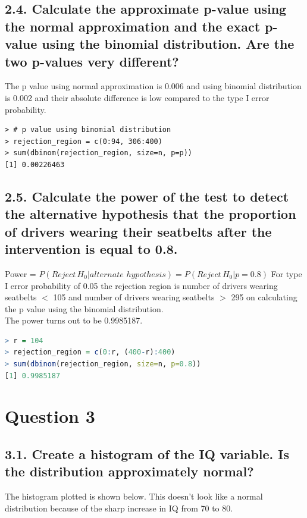 \documentclass[11pt]{article}
\begin{document}
\subsection*{2.4. Calculate the approximate p-value using the normal approximation and the exact p-value using the binomial distribution. Are the two p-values very different?}
The p value using normal approximation is 0.006 and using binomial distribution is 0.002 and their absolute difference is low compared to the type I error probability.
\begin{lstlisting}
> # p value using binomial distribution
> rejection_region = c(0:94, 306:400)
> sum(dbinom(rejection_region, size=n, p=p))
[1] 0.00226463
\end{lstlisting}


\subsection*{2.5. Calculate the power of the test to detect the alternative hypothesis that the proportion of drivers wearing their seatbelts after the intervention is equal to 0.8.}
Power = $P(Reject\, H_0| alternate \,\, hypothesis) = P(Reject\, H_0| p=0.8)$
For type I error probability of 0.05 the rejection region is number of drivers wearing seatbelts $<$ 105 and number of drivers wearing seatbelts $>$ 295 on calculating the p value using the binomial distribution.\\
The power turns out to be 0.9985187.
\begin{lstlisting}[language=R]
> r = 104
> rejection_region = c(0:r, (400-r):400)
> sum(dbinom(rejection_region, size=n, p=0.8))
[1] 0.9985187
\end{lstlisting}


\section*{Question 3}

\subsection*{3.1. Create a histogram of the IQ variable. Is the distribution approximately normal?}
The histogram plotted is shown below. This doesn't look like a normal distribution because of the sharp increase in IQ from 70 to 80. 
\end{document}
